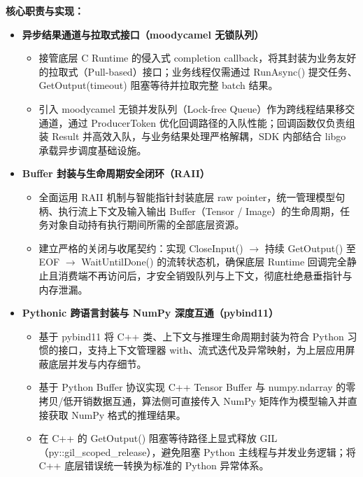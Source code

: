 \documentclass[9pt,a4paper]{ctexart}
\begin{document}
\textbf{核心职责与实现：}
\begin{itemize}
  \item \textbf{异步结果通道与拉取式接口（moodycamel 无锁队列）}
    \begin{itemize}
      \item 接管底层 C Runtime 的侵入式 completion callback，将其封装为业务友好的拉取式（Pull-based）接口；业务线程仅需通过 RunAsync() 提交任务、GetOutput(timeout) 阻塞等待并拉取完整 batch 结果。
      \item 引入 moodycamel 无锁并发队列（Lock-free Queue）作为跨线程结果移交通道，通过 ProducerToken 优化回调路径的入队性能；回调函数仅负责组装 Result 并高效入队，与业务结果处理严格解耦，SDK 内部结合 libgo 承载异步调度基础设施。
    \end{itemize}
  \item \textbf{Buffer 封装与生命周期安全闭环（RAII）}
    \begin{itemize}
      \item 全面运用 RAII 机制与智能指针封装底层 raw pointer，统一管理模型句柄、执行流上下文及输入输出 Buffer（Tensor / Image）的生命周期，任务对象自动持有执行期间所需的全部底层资源。
      \item 建立严格的关闭与收尾契约：实现 CloseInput() \(\rightarrow\) 持续 GetOutput() 至 EOF \(\rightarrow\) WaitUntilDone() 的流转状态机，确保底层 Runtime 回调完全静止且消费端不再访问后，才安全销毁队列与上下文，彻底杜绝悬垂指针与内存泄漏。
    \end{itemize}
  \item \textbf{Pythonic 跨语言封装与 NumPy 深度互通（pybind11）}
    \begin{itemize}
      \item 基于 pybind11 将 C++ 类、上下文与推理生命周期封装为符合 Python 习惯的接口，支持上下文管理器 with、流式迭代及异常映射，为上层应用屏蔽底层并发与内存细节。
      \item 基于 Python Buffer 协议实现 C++ Tensor Buffer 与 numpy.ndarray 的零拷贝/低开销数据互通，算法侧可直接传入 NumPy 矩阵作为模型输入并直接获取 NumPy 格式的推理结果。
      \item 在 C++ 的 GetOutput() 阻塞等待路径上显式释放 GIL（py::gil\_scoped\_release），避免阻塞 Python 主线程与并发业务逻辑；将 C++ 底层错误统一转换为标准的 Python 异常体系。
    \end{itemize}
\end{itemize}
\end{document}
